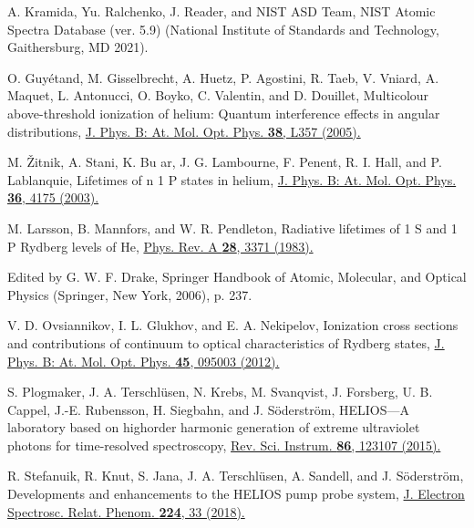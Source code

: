 \documentclass[7pt]{article}
\begin{document}
\begin{multicols}{2}
\begin{thebibliography}{30}
\bibitem{} A. Kramida, Yu. Ralchenko, J. Reader, and NIST ASD Team,
NIST Atomic Spectra Database (ver. 5.9) (National Institute of
Standards and Technology, Gaithersburg, MD 2021).
\vspace{-1.5mm}

\bibitem{} O. Guyétand, M. Gisselbrecht, A. Huetz, P. Agostini, R. Taeb,
V. Vniard, A. Maquet, L. Antonucci, O. Boyko, C. Valentin, and
D. Douillet, Multicolour above-threshold ionization of helium:
Quantum interference effects in angular distributions, \href{https://iopscience.iop.org/article/10.1088/0953-4075/38/22/L01}{J. Phys.
B: At. Mol. Opt. Phys. \textbf{38}, L357 (2005).}
\vspace{-1.5mm}

\bibitem{} M. Žitnik, A. Stani, K. Bu ar, J. G. Lambourne, F. Penent, R. I.
Hall, and P. Lablanquie, Lifetimes of n 1
P states in helium, \href{https://iopscience.iop.org/article/10.1088/0953-4075/36/20/010}{J.
Phys. B: At. Mol. Opt. Phys. \textbf{36}, 4175 (2003).}
\vspace{-1.5mm}

\bibitem{} M. Larsson, B. Mannfors, and W. R. Pendleton, Radiative lifetimes of 1
S and 1
P Rydberg levels of He, \href{https://journals.aps.org/pra/abstract/10.1103/PhysRevA.28.3371}{Phys. Rev. A \textbf{28}, 3371
(1983).}
\vspace{-1.5mm}

\bibitem{} Edited by G. W. F. Drake, Springer Handbook of Atomic,
Molecular, and Optical Physics (Springer, New York, 2006),
p. 237.
\vspace{-1.5mm}

\bibitem{} V. D. Ovsiannikov, I. L. Glukhov, and E. A. Nekipelov, Ionization cross sections and contributions of continuum to optical
characteristics of Rydberg states, \href{https://iopscience.iop.org/article/10.1088/0953-4075/45/9/095003}{J. Phys. B: At. Mol. Opt. Phys.
\textbf{45}, 095003 (2012).}
\vspace{-1.5mm}

\bibitem{} S. Plogmaker, J. A. Terschlüsen, N. Krebs, M. Svanqvist,
J. Forsberg, U. B. Cappel, J.-E. Rubensson, H. Siegbahn,
and J. Söderström, HELIOS—A laboratory based on highorder harmonic generation of extreme ultraviolet photons for
time-resolved spectroscopy, \href{https://aip.scitation.org/doi/10.1063/1.4937463}{Rev. Sci. Instrum. \textbf{86}, 123107
(2015).}
\vspace{-1.5mm}

\bibitem{} R. Stefanuik, R. Knut, S. Jana, J. A. Terschlüsen, A. Sandell,
and J. Söderström, Developments and enhancements to the
HELIOS pump probe system, \href{https://www.sciencedirect.com/science/article/abs/pii/S0368204817300129?via%3Dihub}{J. Electron Spectrosc. Relat.
Phenom. \textbf{224}, 33 (2018).}
\vspace{-1.5mm}


\end{thebibliography}
\end{multicols}
\end{document}
